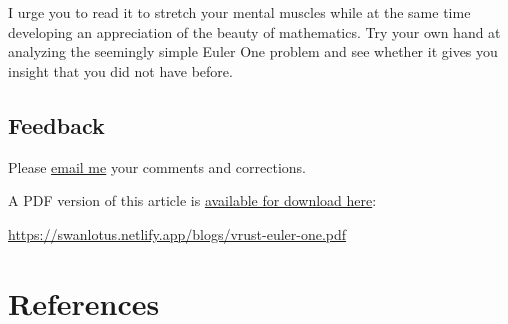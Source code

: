 \documentclass[
  a4paper,
]{article}
\begin{document}
I urge you to read it to stretch your mental muscles while at the same
time developing an appreciation of the beauty of mathematics. Try your
own hand at analyzing the seemingly simple Euler One problem and see
whether it gives you insight that you did not have before.

\hypertarget{feedback}{%
\subsection{Feedback}\label{feedback}}

Please \href{mailto:feedback.swanlotus@gmail.com}{email me} your
comments and corrections.

\noindent A PDF version of this article is
\href{./rust-euler-one.pdf}{available for download here}:

\begin{small}

\begin{sffamily}

\url{https://swanlotus.netlify.app/blogs/vrust-euler-one.pdf}

\end{sffamily}

\end{small}

\hypertarget{bibliography}{%
\section*{References}\label{bibliography}}
\end{document}

